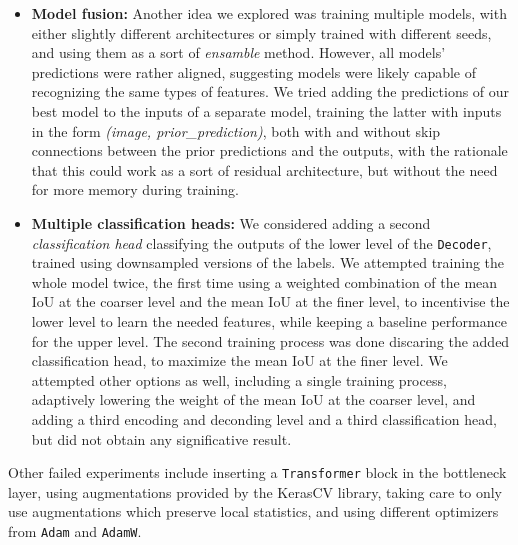 \documentclass[11pt]{article}
\begin{document}
\begin{multicols}{2}
\begin{itemize}[leftmargin=*]
            \item \textbf{Model fusion:} Another idea we explored was training multiple models, with either slightly different architectures or simply trained with different seeds, and using them as a sort of \textit{ensamble} method. However, all models' predictions were rather aligned, suggesting models were likely capable of recognizing the same types of features. We tried adding the predictions of our best model to the inputs of a separate model, training the latter with inputs in the form \textit{(image, prior\_prediction)}, both with and without skip connections between the prior predictions and the outputs, with the rationale that this could work as a sort of residual architecture, but without the need for more memory during training.
            \item \textbf{Multiple classification heads:} We considered adding a second \textit{classification head} classifying the outputs of the lower level of the \texttt{Decoder}, trained using downsampled versions of the labels. We attempted training the whole model twice, the first time using a weighted combination of the mean IoU at the coarser level and the mean IoU at the finer level, to incentivise the lower level to learn the needed features, while keeping a baseline performance for the upper level. The second training process was done discaring the added classification head, to maximize the mean IoU at the finer level. We attempted other options as well, including a single training process, adaptively lowering the weight of the mean IoU at the coarser level, and adding a third encoding and deconding level and a third classification head, but did not obtain any significative result.
      \end{itemize}
      Other failed experiments include inserting a \texttt{Transformer} block in the bottleneck layer, using augmentations provided by the KerasCV library, taking care to only use augmentations which preserve local statistics, and using different optimizers from \texttt{Adam} and \texttt{AdamW}.



\end{multicols}
\end{document}
